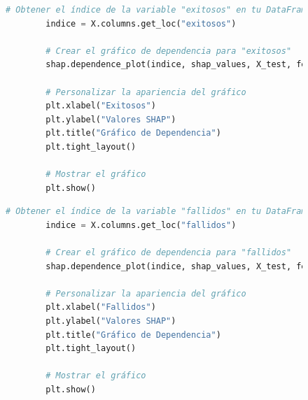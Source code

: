 \begin{figure}[H]
    \centering
    \begin{minipage}{0.48\textwidth}
        \begin{lstlisting}[language=Python, caption=Grafico de dependencia exitosos, label=lst:grafDepExitosos]
        # Obtener el índice de la variable "exitosos" en tu DataFrame
        indice = X.columns.get_loc("exitosos")
        
        # Crear el gráfico de dependencia para "exitosos"
        shap.dependence_plot(indice, shap_values, X_test, feature_names=X.columns, show=False)
        
        # Personalizar la apariencia del gráfico
        plt.xlabel("Exitosos")
        plt.ylabel("Valores SHAP")
        plt.title("Gráfico de Dependencia")
        plt.tight_layout()
        
        # Mostrar el gráfico
        plt.show()
        \end{lstlisting}
    \end{minipage}
    \hfill
    \begin{minipage}{0.48\textwidth}
        \begin{lstlisting}[language=Python, caption=Grafico de dependencia fallidos, label=lst:grafDepFallidos]
        # Obtener el índice de la variable "fallidos" en tu DataFrame
        indice = X.columns.get_loc("fallidos")
        
        # Crear el gráfico de dependencia para "fallidos"
        shap.dependence_plot(indice, shap_values, X_test, feature_names=X.columns, show=False)
        
        # Personalizar la apariencia del gráfico
        plt.xlabel("Fallidos")
        plt.ylabel("Valores SHAP")
        plt.title("Gráfico de Dependencia")
        plt.tight_layout()
        
        # Mostrar el gráfico
        plt.show()
        \end{lstlisting}
    \end{minipage}
\end{figure}

